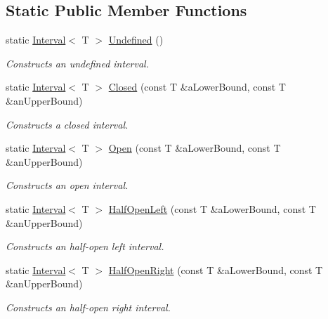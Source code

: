 \subsection*{Static Public Member Functions}
\begin{DoxyCompactItemize}
\item 
static \hyperlink{classlibrary_1_1math_1_1obj_1_1_interval}{Interval}$<$ T $>$ \hyperlink{classlibrary_1_1math_1_1obj_1_1_interval_a415849a8c5306d6811612a842a5d0a40}{Undefined} ()
\begin{DoxyCompactList}\small\item\em Constructs an undefined interval. \end{DoxyCompactList}\item 
static \hyperlink{classlibrary_1_1math_1_1obj_1_1_interval}{Interval}$<$ T $>$ \hyperlink{classlibrary_1_1math_1_1obj_1_1_interval_aae8bb2b89af450729338d48563def4d7}{Closed} (const T \&a\+Lower\+Bound, const T \&an\+Upper\+Bound)
\begin{DoxyCompactList}\small\item\em Constructs a closed interval. \end{DoxyCompactList}\item 
static \hyperlink{classlibrary_1_1math_1_1obj_1_1_interval}{Interval}$<$ T $>$ \hyperlink{classlibrary_1_1math_1_1obj_1_1_interval_add0e1114a0c153da7a928fd059a08919}{Open} (const T \&a\+Lower\+Bound, const T \&an\+Upper\+Bound)
\begin{DoxyCompactList}\small\item\em Constructs an open interval. \end{DoxyCompactList}\item 
static \hyperlink{classlibrary_1_1math_1_1obj_1_1_interval}{Interval}$<$ T $>$ \hyperlink{classlibrary_1_1math_1_1obj_1_1_interval_a7e706c1e5133c731645e7633a9d763bd}{Half\+Open\+Left} (const T \&a\+Lower\+Bound, const T \&an\+Upper\+Bound)
\begin{DoxyCompactList}\small\item\em Constructs an half-\/open left interval. \end{DoxyCompactList}\item 
static \hyperlink{classlibrary_1_1math_1_1obj_1_1_interval}{Interval}$<$ T $>$ \hyperlink{classlibrary_1_1math_1_1obj_1_1_interval_a1a15d0518cc69fa3e442fc39c0622477}{Half\+Open\+Right} (const T \&a\+Lower\+Bound, const T \&an\+Upper\+Bound)
\begin{DoxyCompactList}\small\item\em Constructs an half-\/open right interval. \end{DoxyCompactList}\item 

\end{DoxyCompactItemize}
